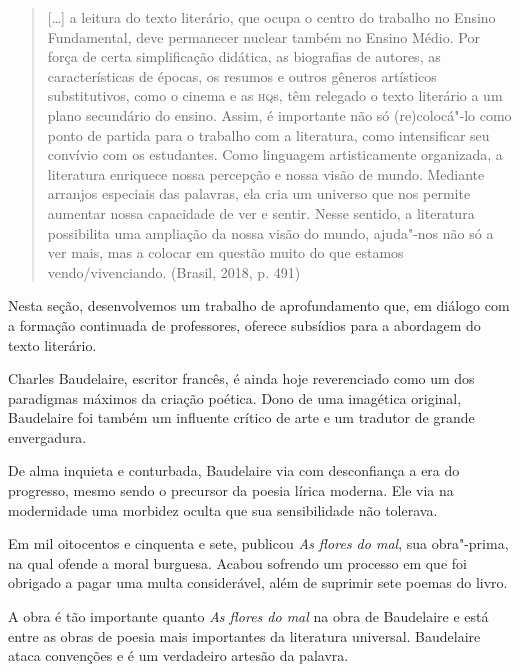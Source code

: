 \documentclass[12pt]{extarticle}
\begin{document}
\begin{quote}
{[}\ldots{}{]} a leitura do texto literário, que ocupa o centro do trabalho
no Ensino Fundamental, deve permanecer nuclear também no Ensino Médio.
Por força de certa simplificação didática, as biografias de autores, as
características de épocas, os resumos e outros gêneros artísticos
substitutivos, como o cinema e as \textsc{hq}s, têm relegado o texto literário a
um plano secundário do ensino. Assim, é importante não só (re)colocá"-lo
como ponto de partida para o trabalho com a literatura, como
intensificar seu convívio com os estudantes. Como linguagem
artisticamente organizada, a literatura enriquece nossa percepção e
nossa visão de mundo. Mediante arranjos especiais das palavras, ela cria
um universo que nos permite aumentar nossa capacidade de ver e sentir.
Nesse sentido, a literatura possibilita uma ampliação da nossa visão do
mundo, ajuda"-nos não só a ver mais, mas a colocar em questão muito do
que estamos vendo/vivenciando. (Brasil, 2018, p. 491)
\end{quote}

Nesta seção, desenvolvemos um trabalho de aprofundamento que, em diálogo
com a formação continuada de professores, oferece subsídios para a
abordagem do texto literário.

Charles Baudelaire, escritor francês, é ainda hoje reverenciado como
um dos paradigmas máximos da criação poética.
Dono de uma imagética original, Baudelaire foi também um influente
crítico de arte e um tradutor de grande envergadura.




De alma inquieta e conturbada, Baudelaire via com desconfiança a era do
progresso, mesmo sendo o precursor da poesia lírica moderna.
Ele via na modernidade uma morbidez oculta que sua sensibilidade não
tolerava.


 

Em mil oitocentos e cinquenta e sete, publicou \textit{As flores do mal},
sua obra"-prima, na qual ofende a moral burguesa. Acabou sofrendo um
processo em que foi obrigado a pagar uma multa considerável, além de
suprimir sete poemas do livro.

A obra é tão importante quanto \textit{As flores do mal} na obra de
Baudelaire e está entre as obras de poesia mais importantes da
literatura universal.
Baudelaire ataca convenções e é um verdadeiro artesão da palavra.
\end{document}
